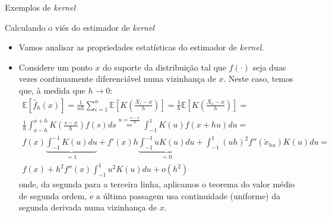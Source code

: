 \documentclass[11pt]{beamer}
\begin{document}
	\begin{frame}{Exemplos de \textit{kernel}}
		\centering 
	\end{frame}
	
	\begin{frame}{Calculando o viés do estimador de \textit{kernel}}
		\begin{itemize}
			\item Vamos analisar as propriedades estatísticas do estimador de \textit{kernel}.
			
			\item Considere um ponto $x$ do suporte da distribuição tal que $f(\cdot)$ seja duas vezes continuamente diferenciável numa vizinhança de $x$. Neste caso, temos que, à medida que $h \to 0$:
			\begin{equation*}
				\begin{aligned}
					\mathbb{E}[\hat{f}_h(x)] = \frac{1}{nh} \sum_{i=1}^n\mathbb{E}\left[K\left(\frac{X_i - x}{h}\right)\right] = \frac{1}{h}\mathbb{E}\left[K\left(\frac{X_1 - x}{h}\right)\right] = \\
				 \frac{1}{h}\int_{x - h}^{x+h} K\left(\frac{s-x}{h}\right) f(s) ds \overset{u = \frac{s-x}{h}}{=}	\int_{-1}^{1} K(u) f(x+hu) du = \\
					f(x)\underbrace{\int_{-1}^{-1}K(u)du}_{=1} + f'(x) h \underbrace{\int_{-1}^{-1}uK(u)du}_{=0} + \int_{-1}^1 (uh)^2 f''(\tilde{x}_{hu}) K(u) du = \\
					f(x) +h^2 f''(x) \int_{-1}^{1} u^2 K(u) du + o(h^2)  
				\end{aligned}
			\end{equation*}
			onde, da segunda para a terceira linha, aplicamos o teorema do valor médio de segunda ordem, e a última passagem usa continuidade (uniforme) da segunda derivada numa vizinhança de $x$.
		\end{itemize}
	\end{frame}
	
\end{document}
